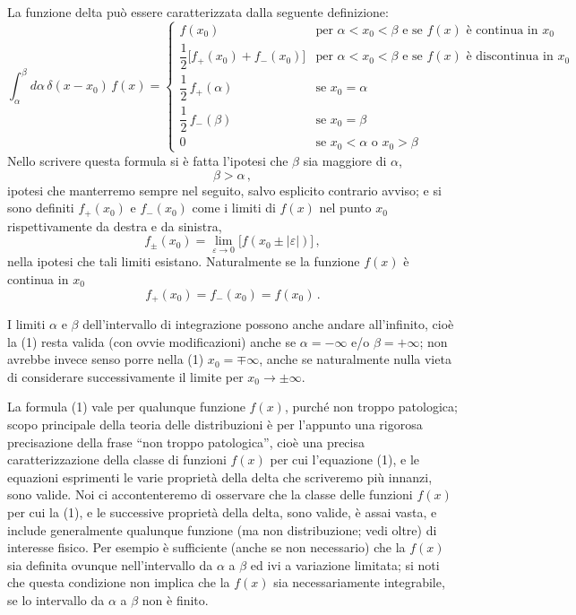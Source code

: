 \documentclass[11pt, a4paper]{book}
\numberwithin{equation}{section}
\begin{document}
La funzione delta può essere caratterizzata dalla seguente definizione:
\begin{equation}
\int_{\alpha}^{\beta} d\alpha\, \delta(x - x_0)\, f(x) =
\begin{cases}
f(x_0) & \text{per } \alpha < x_0 < \beta \text{ e se } f(x) \text{ è continua in } x_0 \\[6pt]
\dfrac{1}{2}\bigl[f_+(x_0) + f_-(x_0)\bigr] & \text{per } \alpha < x_0 < \beta \text{ e se } f(x) \text{ è discontinua in } x_0 \\[6pt]
\dfrac{1}{2}\, f_+(\alpha) & \text{se } x_0 = \alpha \\[6pt]
\dfrac{1}{2}\, f_-(\beta) & \text{se } x_0 = \beta \\[6pt]
0 & \text{se } x_0 < \alpha \text{ o } x_0 > \beta
\end{cases}
\tag{1}
\end{equation}
Nello scrivere questa formula si è fatta l'ipotesi che $\beta$ sia maggiore di $\alpha$,
\begin{equation}
\beta > \alpha \,,
\tag{2}
\end{equation}
ipotesi che manterremo sempre nel seguito, salvo esplicito contrario avviso; e si sono definiti $f_+(x_0)$ e $f_-(x_0)$ come i limiti di $f(x)$ nel punto $x_0$ rispettivamente da destra e da sinistra,
\begin{equation}
f_\pm(x_0) = \lim_{\varepsilon \to 0}\bigl[f(x_0 \pm |\varepsilon|)\bigr] \,,
\tag{3}
\end{equation}
nella ipotesi che tali limiti esistano. Naturalmente se la funzione $f(x)$ è continua in $x_0$
\begin{equation}
f_+(x_0) = f_-(x_0) = f(x_0) \,.
\tag{4}
\end{equation}

I limiti $\alpha$ e $\beta$ dell'intervallo di integrazione possono anche andare all'infinito, cioè la (1) resta valida (con ovvie modificazioni) anche se $\alpha = -\infty$ e/o $\beta = +\infty$; non avrebbe invece senso porre nella (1) $x_0 = \mp\infty$, anche se naturalmente nulla vieta di considerare successivamente il limite per $x_0 \to \pm\infty$.

La formula (1) vale per qualunque funzione $f(x)$, purché non troppo patologica; scopo principale della teoria delle distribuzioni è per l'appunto una rigorosa precisazione della frase ``non troppo patologica'', cioè una precisa caratterizzazione della classe di funzioni $f(x)$ per cui l'equazione (1), e le equazioni esprimenti le varie proprietà della delta che scriveremo più innanzi, sono valide. Noi ci accontenteremo di osservare che la classe delle funzioni $f(x)$ per cui la (1), e le successive proprietà della delta, sono valide, è assai vasta, e include generalmente qualunque funzione (ma non distribuzione; vedi oltre) di interesse fisico. Per esempio è sufficiente (anche se non necessario) che la $f(x)$ sia definita ovunque nell'intervallo da $\alpha$ a $\beta$ ed ivi a variazione limitata; si noti che questa condizione non implica che la $f(x)$ sia necessariamente integrabile, se lo intervallo da $\alpha$ a $\beta$ non è finito.
\end{document}
